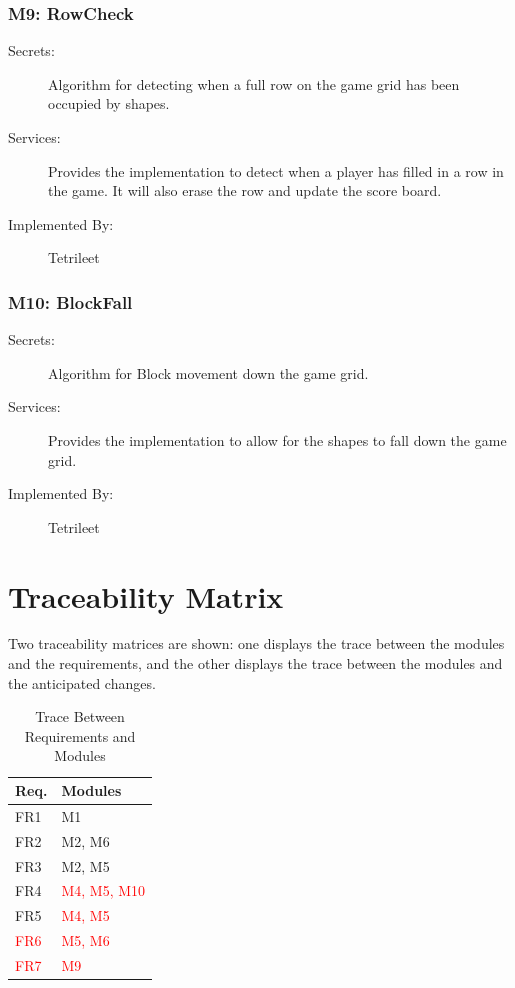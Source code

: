 \documentclass[12pt, titlepage]{article}
\begin{document}
\subsubsection{M9: RowCheck}

\begin{description}
\item[Secrets:]Algorithm for detecting when a full row on the game grid has been occupied by shapes.
\item[Services:] Provides the implementation to detect when a player has filled in a row in the game. It will also erase the row and update the score board.
\item[Implemented By:] Tetrileet 
\end{description}

\subsubsection{M10: BlockFall}

\begin{description}
\item[Secrets:]Algorithm for Block movement down the game grid.
\item[Services:]Provides the implementation to allow for the shapes to fall down the game grid.
\item[Implemented By:] Tetrileet
\end{description}


\section{Traceability Matrix} \label{SecTM}

Two traceability matrices are shown:
one displays the trace between the modules and the
requirements, and the other displays the trace between the modules and the anticipated changes.

\begin{table}[H]
\centering
\begin{tabular}{p{} p{}}
\toprule
\textbf{Req.} & \textbf{Modules}\\
\midrule
FR1 & M1\\
FR2 & M2, M6\\
FR3 & M2, M5\\
FR4 & \textcolor{red}{M4, M5, M10}\\
FR5 & \textcolor{red}{M4, M5}\\
\textcolor{red}{FR6} & \textcolor{red}{M5, M6}\\
\textcolor{red}{FR7} & \textcolor{red}{M9}\\
\bottomrule
\end{tabular}
\caption{Trace Between Requirements and Modules}
\label{TblRT}
\end{table}
\end{document}

